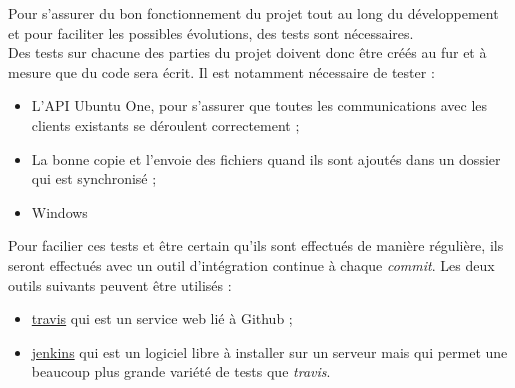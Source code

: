 Pour s'assurer du bon fonctionnement du projet tout au long du développement et pour faciliter les possibles évolutions, des tests sont nécessaires.\\

Des tests sur chacune des parties du projet doivent donc être créés au fur et à mesure que du code sera écrit. Il est notamment nécessaire de tester :\\

\begin{itemize}
\renewcommand{\labelitemi}{$\bullet$}
\item L'API Ubuntu One, pour s'assurer que toutes les communications avec les clients existants se déroulent correctement ;
\item La bonne copie et l'envoie des fichiers quand ils sont ajoutés dans un dossier qui est synchronisé ;
\item Windows
\end{itemize}

\vspace{0.5cm}

Pour facilier ces tests et être certain qu'ils sont effectués de manière régulière, ils seront effectués avec un outil d'intégration continue à chaque \textit{commit}. Les deux outils suivants peuvent être utilisés :\\

\begin{itemize}
\renewcommand{\labelitemi}{$\bullet$}
\item \href{https://travis-ci.org}{travis} qui est un service web lié à Github ;
\item \href{http://jenkins-ci.org}{jenkins} qui est un logiciel libre à installer sur un serveur mais qui permet une beaucoup plus grande variété de tests que \textit{travis}.
\end{itemize}
